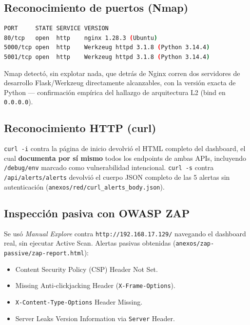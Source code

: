 \documentclass[journal]{IEEEtran}
\begin{document}
\subsection{Reconocimiento de puertos (Nmap)}

\begin{lstlisting}[language=bash, caption={nmap -sV sobre 80, 5000 y 5001 (anexos/red/nmap\_ports\_extra.nmap)}]
PORT     STATE SERVICE VERSION
80/tcp   open  http    nginx 1.28.3 (Ubuntu)
5000/tcp open  http    Werkzeug httpd 3.1.8 (Python 3.14.4)
5001/tcp open  http    Werkzeug httpd 3.1.8 (Python 3.14.4)
\end{lstlisting}

Nmap detectó, sin explotar nada, que detrás de Nginx corren dos servidores de
desarrollo Flask/Werkzeug directamente alcanzables, con la versión exacta de
Python --- confirmación empírica del hallazgo de arquitectura L2 (bind en
\texttt{0.0.0.0}).

\subsection{Reconocimiento HTTP (curl)}

\texttt{curl -i} contra la página de inicio devolvió el HTML completo del
dashboard, el cual \textbf{documenta por sí mismo} todos los endpoints de
ambas APIs, incluyendo \texttt{/debug/env} marcado como vulnerabilidad
intencional. \texttt{curl -s} contra \texttt{/api/alerts/alerts} devolvió el
cuerpo JSON completo de las 5 alertas sin autenticación
(\texttt{anexos/red/curl\_alerts\_body.json}).

\subsection{Inspección pasiva con OWASP ZAP}

Se usó \textit{Manual Explore} contra \texttt{http://192.168.17.129/}
navegando el dashboard real, sin ejecutar Active Scan. Alertas pasivas
obtenidas (\texttt{anexos/zap-passive/zap-report.html}):

\begin{itemize}
    \item Content Security Policy (CSP) Header Not Set.
    \item Missing Anti-clickjacking Header (\texttt{X-Frame-Options}).
    \item \texttt{X-Content-Type-Options} Header Missing.
    \item Server Leaks Version Information via \texttt{Server} Header.
\end{itemize}
\end{document}
